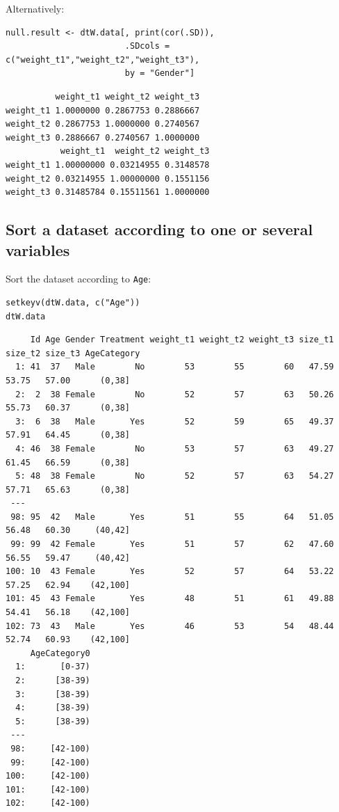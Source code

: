 \documentclass{article}
\begin{document}
Alternatively:
\lstset{language=r,label= ,caption= ,captionpos=b,numbers=none}
\begin{lstlisting}
null.result <- dtW.data[, print(cor(.SD)), 
                        .SDcols = c("weight_t1","weight_t2","weight_t3"), 
                        by = "Gender"]
\end{lstlisting}

\begin{verbatim}
          weight_t1 weight_t2 weight_t3
weight_t1 1.0000000 0.2867753 0.2886667
weight_t2 0.2867753 1.0000000 0.2740567
weight_t3 0.2886667 0.2740567 1.0000000
           weight_t1  weight_t2 weight_t3
weight_t1 1.00000000 0.03214955 0.3148578
weight_t2 0.03214955 1.00000000 0.1551156
weight_t3 0.31485784 0.15511561 1.0000000
\end{verbatim}

\subsection{Sort a dataset according to one or several variables}
\label{sec:org442d522}

Sort the dataset according to \texttt{Age}:
\lstset{language=r,label= ,caption= ,captionpos=b,numbers=none}
\begin{lstlisting}
setkeyv(dtW.data, c("Age"))
dtW.data
\end{lstlisting}

\begin{verbatim}
     Id Age Gender Treatment weight_t1 weight_t2 weight_t3 size_t1 size_t2 size_t3 AgeCategory
  1: 41  37   Male        No        53        55        60   47.59   53.75   57.00      (0,38]
  2:  2  38 Female        No        52        57        63   50.26   55.73   60.37      (0,38]
  3:  6  38   Male       Yes        52        59        65   49.37   57.91   64.45      (0,38]
  4: 46  38 Female        No        53        57        63   49.27   61.45   66.59      (0,38]
  5: 48  38 Female        No        52        57        63   54.27   57.71   65.63      (0,38]
 ---                                                                                          
 98: 95  42   Male       Yes        51        55        64   51.05   56.48   60.30     (40,42]
 99: 99  42 Female       Yes        51        57        62   47.60   56.55   59.47     (40,42]
100: 10  43 Female       Yes        52        57        64   53.22   57.25   62.94    (42,100]
101: 45  43 Female       Yes        48        51        61   49.88   54.41   56.18    (42,100]
102: 73  43   Male       Yes        46        53        54   48.44   52.74   60.93    (42,100]
     AgeCategory0
  1:       [0-37)
  2:      [38-39)
  3:      [38-39)
  4:      [38-39)
  5:      [38-39)
 ---             
 98:     [42-100)
 99:     [42-100)
100:     [42-100)
101:     [42-100)
102:     [42-100)
\end{verbatim}
\end{document}
